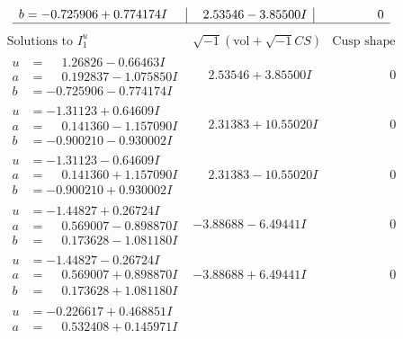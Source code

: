\documentclass[1p]{elsarticle_modified}
\theoremstyle{definition}
\newcommand{\I}{\sqrt{-1}}
\begin{document}
$$\begin{array}{c|c|c}
\begin{aligned}
b &= -0.725906 + 0.774174 I\end{aligned}
 & \phantom{-}2.53546 - 3.85500 I & \phantom{-0.000000 } 0\\
 \hline 
 \end{array}$$\newpage$$\begin{array}{c|c|c}  
\text{Solutions to }I^u_{1}& \I (\text{vol} + \sqrt{-1}CS) & \text{Cusp shape}\\
 \hline 
\begin{aligned}
u &= \phantom{-}1.26826 - 0.66463 I \\
a &= \phantom{-}0.192837 - 1.075850 I \\
b &= -0.725906 - 0.774174 I\end{aligned}
 & \phantom{-}2.53546 + 3.85500 I & \phantom{-0.000000 } 0 \\ \hline\begin{aligned}
u &= -1.31123 + 0.64609 I \\
a &= \phantom{-}0.141360 - 1.157090 I \\
b &= -0.900210 - 0.930002 I\end{aligned}
 & \phantom{-}2.31383 + 10.55020 I & \phantom{-0.000000 } 0 \\ \hline\begin{aligned}
u &= -1.31123 - 0.64609 I \\
a &= \phantom{-}0.141360 + 1.157090 I \\
b &= -0.900210 + 0.930002 I\end{aligned}
 & \phantom{-}2.31383 - 10.55020 I & \phantom{-0.000000 } 0 \\ \hline\begin{aligned}
u &= -1.44827 + 0.26724 I \\
a &= \phantom{-}0.569007 - 0.898870 I \\
b &= \phantom{-}0.173628 - 1.081180 I\end{aligned}
 & -3.88688 - 6.49441 I & \phantom{-0.000000 } 0 \\ \hline\begin{aligned}
u &= -1.44827 - 0.26724 I \\
a &= \phantom{-}0.569007 + 0.898870 I \\
b &= \phantom{-}0.173628 + 1.081180 I\end{aligned}
 & -3.88688 + 6.49441 I & \phantom{-0.000000 } 0 \\ \hline\begin{aligned}
u &= -0.226617 + 0.468851 I \\
a &= \phantom{-}0.532408 + 0.145971 I \\

\end{aligned}
\end{array}$$
\end{document}

